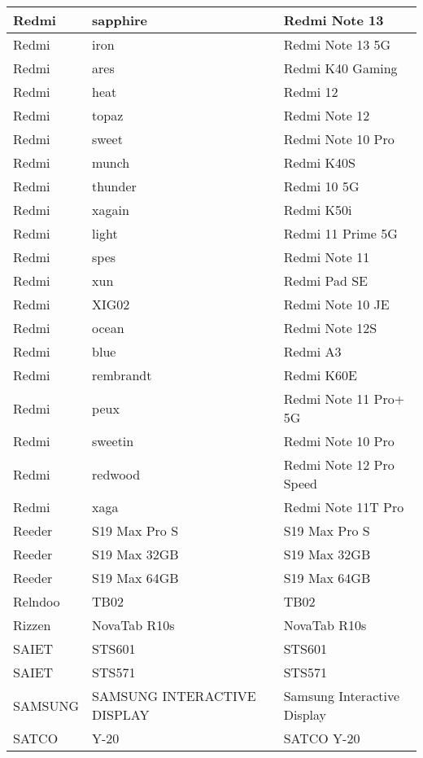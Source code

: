 \begin{tabularx}{\linewidth}{|l|X|X|}
        Redmi & sapphire & Redmi Note 13 \\ \hline
        Redmi & iron & Redmi Note 13 5G \\ \hline
        Redmi & ares & Redmi K40 Gaming \\ \hline
        Redmi & heat & Redmi 12 \\ \hline
        Redmi & topaz & Redmi Note 12 \\ \hline
        Redmi & sweet & Redmi Note 10 Pro \\ \hline
        Redmi & munch & Redmi K40S \\ \hline
        Redmi & thunder & Redmi 10 5G \\ \hline
        Redmi & xagain & Redmi K50i \\ \hline
        Redmi & light & Redmi 11 Prime 5G \\ \hline
        Redmi & spes & Redmi Note 11 \\ \hline
        Redmi & xun & Redmi Pad SE \\ \hline
        Redmi & XIG02 & Redmi Note 10 JE \\ \hline
        Redmi & ocean & Redmi Note 12S \\ \hline
        Redmi & blue & Redmi A3 \\ \hline
        Redmi & rembrandt & Redmi K60E \\ \hline
        Redmi & peux & Redmi Note 11 Pro+ 5G \\ \hline
        Redmi & sweetin & Redmi Note 10 Pro \\ \hline
        Redmi & redwood & Redmi Note 12 Pro Speed \\ \hline
        Redmi & xaga & Redmi Note 11T Pro \\ \hline
        Reeder & S19 Max Pro S & S19 Max Pro S \\ \hline
        Reeder & S19 Max 32GB & S19 Max 32GB \\ \hline
        Reeder & S19 Max 64GB & S19 Max 64GB \\ \hline
        Relndoo & TB02 & TB02 \\ \hline
        Rizzen & NovaTab R10s & NovaTab R10s \\ \hline
        SAIET & STS601 & STS601 \\ \hline
        SAIET & STS571 & STS571 \\ \hline
        SAMSUNG & SAMSUNG INTERACTIVE DISPLAY & Samsung Interactive Display \\ \hline
        SATCO & Y-20 & SATCO Y-20 \\ \hline

\end{tabularx}

